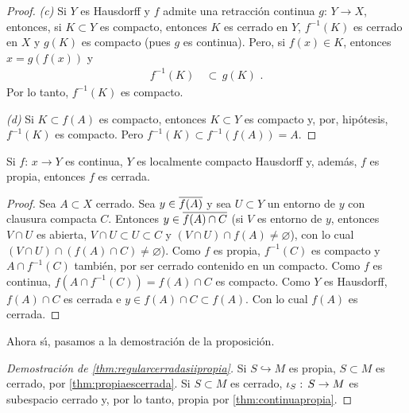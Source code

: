 \begin{proof}
	\emph{(c)} Si $Y$ es Hausdorff y $f$ admite una retracci\'{o}n
	continua $g:\,Y\rightarrow X$, entonces, si $K\subset Y$ es compacto,
	entonces $K$ es cerrado en $Y$, $f^{-1}(K)$ es cerrado en $X$ y
	$g(K)$ es compacto (pues $g$ es continua). Pero, si $f(x)\in K$,
	entonces $x=g(f(x))$ y
	\begin{align*}
		f^{-1}(K) & \,\subset\, g(K)
		\text{ .}
	\end{align*}
	Por lo tanto, $f^{-1}(K)$ es compacto.

	\emph{(d)} Si $K\subset f(A)$ es compacto, entonces $K\subset Y$
	es compacto y, por, hip\'{o}tesis, $f^{-1}(K)$ es compacto.
	Pero $f^{-1}(K)\subset f^{-1}(f(A))=A$.
\end{proof}

\begin{lemaPropiaEsCerrada}\label{thm:propiaescerrada}
	Si $f:\,x\rightarrow Y$ es continua, $Y$ es localmente compacto
	Hausdorff y, adem\'{a}s, $f$ es propia, entonces $f$ es cerrada.
\end{lemaPropiaEsCerrada}

\begin{proof}
	Sea $A\subset X$ cerrado. Sea $y\in\clos{f(A)}$ y sea $U\subset Y$
	un entorno de $y$ con clausura compacta $C$. Entonces
	$y\in\clos{f(A)\cap C}$ (si $V$ es entorno de $y$, entonces
	$V\cap U$ es abierta, $V\cap U\subset U\subset C$ y
	$(V\cap U)\cap f(A)\not=\varnothing$), con lo cual
	$(V\cap U)\cap (f(A)\cap C)\not=\varnothing$). Como $f$ es propia,
	$f^{-1}(C)$ es compacto y $A\cap f^{-1}(C)$ tambi\'{e}n, por ser
	cerrado contenido en un compacto. Como $f$ es continua,
	$f(A\cap f^{-1}(C))=f(A)\cap C$ es compacto. Como $Y$ es Hausdorff,
	$f(A)\cap C$ es cerrada e $y\in f(A)\cap C\subset f(A)$. Con lo
	cual $f(A)$ es cerrada.
\end{proof}

Ahora s\'{\i}, pasamos a la demostraci\'{o}n de la proposici\'{o}n.

\begin{proof}[Demostraci\'{o}n de \ref{thm:regularcerradasiipropia}]
	Si $S\hookrightarrow M$ es propia, $S\subset M$ es cerrado,
	por \ref{thm:propiaescerrada}. Si $S\subset M$ es cerrado,
	$\inc[S]:\,S\rightarrow M$ es subespacio cerrado y, por lo tanto,
	propia por \ref{thm:continuapropia}.
\end{proof}

